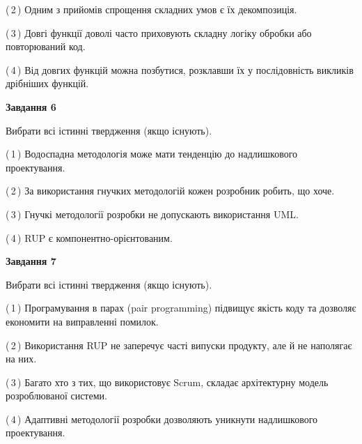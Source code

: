 \documentclass[10pt, ukrainian]{article}
\begin{document}
{\begin {large}
(\,2\,) Одним з прийомів спрощення складних умов є їх декомпозиція. %



(\,3\,) Довгі функції доволі часто приховують складну логіку обробки або повторюваний код. %



(\,4\,) Від довгих функцій можна позбутися, розклавши їх у послідовність викликів дрібніших функцій. %

\newpage

{\begin {center}\textbf{Завдання 6}\end {center}}\par
Вибрати всі істинні твердження (якщо існують).\par
\vspace{2mm}



(\,1\,) Водоспадна методологія може мати тенденцію до надлишкового проектування. %



(\,2\,) За використання гнучких методологій кожен розробник робить, що хоче. %



(\,3\,) Гнучкі методології розробки не допускають використання UML. %



(\,4\,) RUP є компонентно-орієнтованим. %


{\begin {center}\textbf{Завдання 7}\end {center}}\par
Вибрати всі істинні твердження (якщо існують).\par
\vspace{2mm}



(\,1\,) Програмування в парах (pair programming) підвищує якість коду та дозволяє економити на виправленні помилок. %



(\,2\,) Використання RUP не заперечує часті випуски продукту, але й не наполягає на них. %



(\,3\,) Багато хто з тих, що використовує Scrum, складає архітектурну модель розроблюваної системи. %



(\,4\,) Адаптивні методології розробки дозволяють уникнути надлишкового проектування. %



\end{large}}
\end{document}
